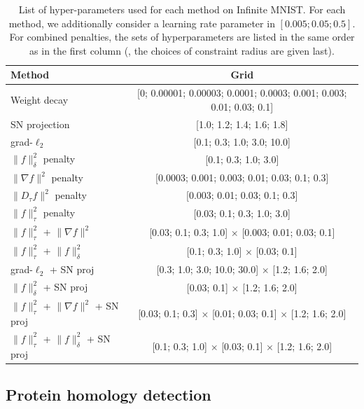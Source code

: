 \begin{table}
\caption{List of hyper-parameters used for each method on Infinite MNIST.
For each method, we additionally consider a learning rate parameter in $[0.005 ; 0.05 ; 0.5]$.
For combined penalties, the sets of hyperparameters are listed in the same order as in the first column
(\eg, the choices of constraint radius are given last).}
\centering
\small
\vspace{0.2cm}
\label{tab:imnist_param_grid}
\begin{tabular}{ | l | c | }
\hline
Method & Grid \\ \hline
\hline
Weight decay & [0; 0.00001; 0.00003; 0.0001; 0.0003; 0.001; 0.003; 0.01; 0.03; 0.1] \\
SN projection & [1.0; 1.2; 1.4; 1.6; 1.8] \\
grad-$\ell_2$ & [0.1; 0.3; 1.0; 3.0; 10.0] \\
$\|f\|_\delta^2$ penalty & [0.1; 0.3; 1.0; 3.0] \\
$\|\nabla f\|^2$ penalty & [0.0003; 0.001; 0.003; 0.01; 0.03; 0.1; 0.3] \\
$\|D_\tau f\|^2$ penalty & [0.003; 0.01; 0.03; 0.1; 0.3] \\
$\|f\|_\tau^2$ penalty & [0.03; 0.1; 0.3; 1.0; 3.0] \\
$\|f\|_{\tau}^2$ + $\|\nabla f\|^2$ & [0.03; 0.1; 0.3; 1.0] $\times$ [0.003; 0.01; 0.03; 0.1] \\
$\|f\|_{\tau}^2$ + $\|f\|^2_\delta$ & [0.1; 0.3; 1.0] $\times$ [0.03; 0.1] \\
grad-$\ell_2$ + SN proj & [0.3; 1.0; 3.0; 10.0; 30.0] $\times$ [1.2; 1.6; 2.0] \\
$\|f\|_\delta^2$ + SN proj & [0.03; 0.1] $\times$ [1.2; 1.6; 2.0] \\
$\|f\|_{\tau}^2$ + $\|\nabla f\|^2$ + SN proj & [0.03; 0.1; 0.3] $\times$ [0.01; 0.03; 0.1] $\times$ [1.2; 1.6; 2.0] \\
$\|f\|_{\tau}^2$ + $\|f\|^2_\delta$ + SN proj & [0.1; 0.3; 1.0] $\times$ [0.03; 0.1] $\times$ [1.2; 1.6; 2.0] \\
\hline
\end{tabular}
\end{table}

\subsection{Protein homology detection}
\label{sub:protein_appx}

